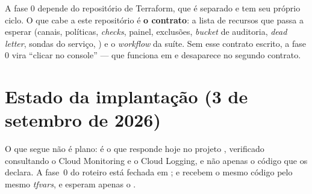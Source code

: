 \begin{atencao}
A fase 0 depende do repositório de Terraform, que é separado e tem seu
próprio ciclo. O que cabe a este repositório é \textbf{o contrato}: a lista
de recursos que  passa a esperar (canais, políticas,
\emph{checks}, painel, exclusões, \emph{bucket} de auditoria, \emph{dead
letter}, sondas do serviço, ) e o \emph{workflow} da
suíte. Sem esse contrato escrito, a fase 0 vira \enquote{clicar no console}
--- que funciona em  e desaparece no segundo contrato.
\end{atencao}

\section{Estado da implantação (3 de setembro de 2026)}
\label{sec:obs-implantado}

O que segue não é plano: é o que responde hoje no projeto ,
verificado consultando o Cloud Monitoring e o Cloud Logging, e não apenas o
código que os declara. A fase~0 do roteiro está fechada em ;  e
 recebem o mesmo código pelo mesmo \emph{tfvars}, e esperam apenas o
.

